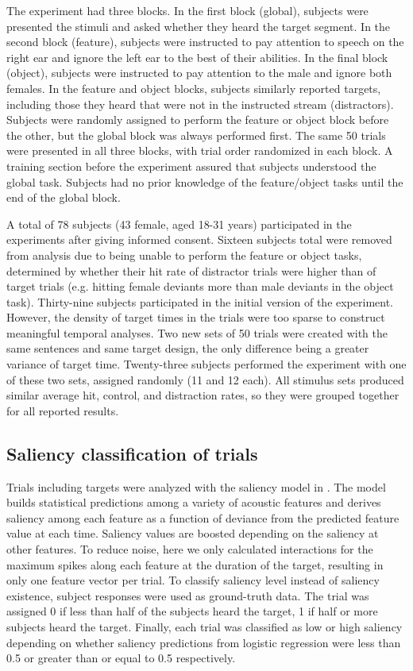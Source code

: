 \documentclass[9pt,twocolumn,twoside]{pnas-new}
\begin{document}
{The experiment had three blocks. In the first block (global), subjects were presented the stimuli and asked whether they heard the target segment. In the second block (feature), subjects were instructed to pay attention to speech on the right ear and ignore the left ear to the best of their abilities. In the final block (object), subjects were instructed to pay attention to the male and ignore both females. In the feature and object blocks, subjects similarly reported targets, including those they heard that were not in the instructed stream (distractors). Subjects were randomly assigned to perform the feature or object block before the other, but the global block was always performed first. The same 50 trials were presented in all three blocks, with trial order randomized in each block. A training section before the experiment assured that subjects understood the global task. Subjects had no prior knowledge of the feature/object tasks until the end of the global block.

A total of 78 subjects (43 female, aged 18-31 years) participated in the experiments after giving informed consent. Sixteen subjects total were removed from analysis due to being unable to perform the feature or object tasks, determined by whether their hit rate of distractor trials were higher than of target trials (e.g. hitting female deviants more than male deviants in the object task). Thirty-nine subjects participated in the initial version of the experiment. However, the density of target times in the trials were too sparse to construct meaningful temporal analyses. Two new sets of 50 trials were created with the same sentences and same target design, the only difference being a greater variance of target time. Twenty-three subjects performed the experiment with one of these two sets, assigned randomly (11 and 12 each). All stimulus sets produced similar average hit, control, and distraction rates, so they were grouped together for all reported results. 


\subsection{Saliency classification of trials} Trials including targets were analyzed with the saliency model in \cite{Kaya14a}. The model builds statistical predictions among a variety of acoustic features and derives saliency among each feature as a function of deviance from the predicted feature value at each time. Saliency values are boosted depending on the saliency at other features. To reduce noise, here we only calculated interactions for the maximum spikes along each feature at the duration of the target, resulting in only one feature vector per trial. To classify saliency level instead of saliency existence, subject responses were used as ground-truth data. The trial was assigned 0 if less than half of the subjects heard the target, 1 if half or more subjects heard the target. Finally, each trial was classified as low or high saliency depending on whether saliency predictions from logistic regression were less than 0.5 or greater than or equal to 0.5 respectively.




} 
\end{document}

